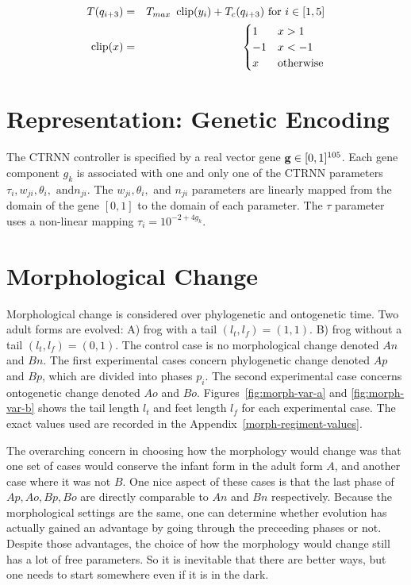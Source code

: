 \begin{eqnarray}
  T(q_{i + 3}) &=& T_{max}~\operatorname{clip}(y_i) + T_c(q_{i + 3}) \text{ for } i \in [1,5] \label{limb-torque} \\
  \operatorname{clip}(x) &=& \begin{cases}
              1 & x > 1 \\
              -1 & x < -1 \\
              x & \text{otherwise} 
              \end{cases} 
\end{eqnarray}

\section{Representation: Genetic Encoding}

The CTRNN controller is specified by a real vector gene $\mathbf{g} \in [0,
  1]^{105}$.  Each gene component $g_k$ is associated with one and
only one of the CTRNN parameters $\tau_i, w_{ji}, \theta_i, \text{ and
} n_{ji}$.  The $w_{ji}, \theta_i,$ and $ n_{ji}$ parameters are
linearly mapped from the domain of the gene $[0,1]$ to the domain of
each parameter.  The $\tau$ parameter uses a non-linear mapping
$\tau_i = 10^{-2 + 4 g_k}$.

\section{Morphological Change}\label{morph-change}

Morphological change is considered over phylogenetic and ontogenetic
time.  Two adult forms are evolved: A) frog with a tail $({l_t},
{l_f}) = (1,1).$ B) frog without a tail $({l_t}, {l_f}) = (0,1).$ The
control case is no morphological change denoted $An$ and $Bn$.  The
first experimental cases concern phylogenetic change denoted $Ap$ and
$Bp$, which are divided into phases $p_i$.  The second experimental
case concerns ontogenetic change denoted $Ao$ and $Bo$.
Figures~\ref{fig:morph-var-a} and \ref{fig:morph-var-b} shows the tail length
${l_t}$ and feet length ${l_f}$ for each experimental case.  The exact
values used are recorded in the Appendix~\ref{morph-regiment-values}.

The overarching concern in choosing how the morphology would change
was that one set of cases would conserve the infant form in the adult
form $A$, and another case where it was not $B$.  One nice aspect of
these cases is that the last phase of $Ap, Ao, Bp, Bo$ are directly
comparable to $An$ and $Bn$ respectively.  Because the morphological
settings are the same, one can determine whether evolution has
actually gained an advantage by going through the preceeding phases or
not.  Despite those advantages, the choice of how the morphology would
change still has a lot of free parameters.  So it is inevitable that
there are better ways, but one needs to start somewhere even if it is
in the dark.

